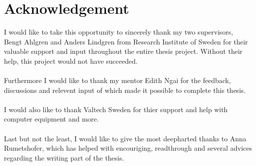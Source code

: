 \section*{Acknowledgement}

I would like to take this opportunity to sincerely thank my two supervisors, Bengt Ahlgren and Anders Lindgren from Research Institute of Sweden for their valuable support and input throughout the entire thesis project. Without their help, this project would not have succeeded.\\\\
Furthermore I would like to thank my mentor Edith Ngai for the feedback, discussions and relevent input of which made it possible to complete this thesis.\\\\
I would also like to thank Valtech Sweden for thier support and help with computer equipment and more.\\\\
Last but not the least, I would like to give the most deepharted thanks to Anna Rumetshofer, which has helped with encouriging, readthrough and several advices regarding the writing part of the thesis.\\\\







